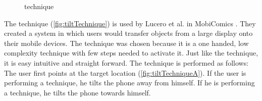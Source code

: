 \begin{figure}[H]
	\caption{\push \throw technique}
	\label{fig:throwTechnique}
\end{figure}

The \tilt technique (\cref{fig:tiltTechnique}) is used by Lucero et al. in MobiComics \cite{Lucero:2012}.
They created a system in which users would transfer objects from a large display onto their mobile devices.
The \throw technique was chosen because it is a one handed, low complexity technique with few steps needed to activate it. 
Just like the \swipe technique, it is easy intuitive and straight forward. 
The \tilt technique is performed as follows:
The user first points at the target location (\cref{fig:tiltTechniqueA}).
If the user is performing a \push technique, he tilts the phone away from himself.
If he is performing a \pull technique, he tilts the phone towards himself. 

